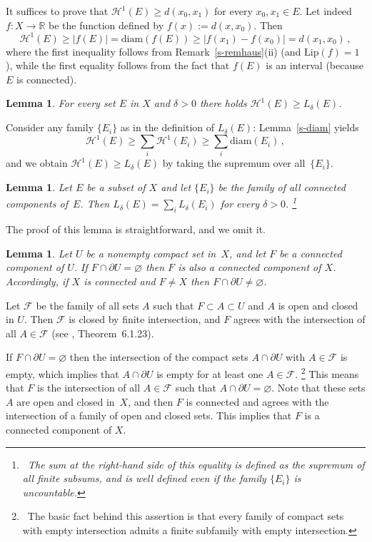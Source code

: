 \documentclass[11pt,reqno,a4paper,final]{amsart}
\makeatletter
\numberwithin{equation}{section}
\theoremstyle{mytheorem}
\newtheorem{lemma}[subsection]{Lemma}
\theoremstyle{myremark}
\theoremstyle{myparagraph}
\renewenvironment{proof}[1][\proofname]{\par 
  \pushQED{\qed}%
  \normalfont \topsep10\p@\@plus6\p@\relax 
  \trivlist 
  \item[\hskip\labelsep 
    \bfseries 
    #1\@addpunct{.}]\ignorespaces 
}{%
  \popQED\endtrivlist\@endpefalse 
}
\providecommand{\proofname}{Proof}
\newcommand{\footnoteb}[1]{\footnote{~#1}}
\newcommand{\R}{\mathbb{R}}
\newcommand{\F}{\mathscr{F}}
\newcommand{\Haus}{\mathscr{H}}
\newcommand{\bd}{\partial}
\newcommand{\diam}{\mathrm{diam}}
\newcommand{\Lip}{\mathrm{Lip}}
\makeatother
\begin{document}
\begin{proof}
It suffices to prove that $\Haus^1(E) \ge d(x_0,x_1)$ for every 
$x_0,x_1\in E$. Let indeed $f:X\to\R$ be the function defined by
$f(x):=d(x,x_0)$. Then 
\[
\Haus^1(E) \ge |f(E)| =\diam(f(E)) \ge |f(x_1)-f(x_0)| = d(x_1,x_0)
\, ,
\]
where the first inequality follows from Remark~\ref{s-remhaus}(ii) 
(and $\Lip(f)=1$), while the first equality follows 
from the fact that $f(E)$ is an interval (because $E$ is connected).
\end{proof}


\begin{lemma}
\label{s-easyineq}
For every set $E$ in $X$ and $\delta>0$ there holds 
$\Haus^1(E) \ge L_\delta(E)$. 
\end{lemma}

\begin{proof}
Consider any family 
$\{E_i\}$ as in the definition of $L_\delta(E)$:
Lemma~\ref{s-diam} yields
\[
\Haus^1(E) \ge \sum_i \Haus^1(E_i) \ge \sum_i\diam(E_i)
\, , 
\]
and we obtain $\Haus^1(E) \ge L_\delta(E)$ 
by taking the supremum over all~$\{E_i\}$.
\end{proof}



\begin{lemma}
\label{s-additivity}
Let $E$ be a subset of $X$ and let
$\{E_i\}$ be the family of all connected components of~$E$. Then
$L_\delta(E) = \sum_i L_\delta(E_i)$
for every $\delta>0$.%
%
\footnoteb{The sum at the right-hand side of this equality 
is defined as the supremum of all finite subsums, and is well 
defined even if the family $\{E_i\}$ is uncountable.}
%
\end{lemma}

The proof of this lemma is straightforward, and we omit it.


\begin{lemma}
\label{s-concompbordo}
Let $U$ be a nonempty compact set in~$X$, and let $F$ be a 
connected component of $U$.
If $F\cap\bd U=\varnothing$ then $F$ is also a connected 
component of $X$. Accordingly, if $X$ is connected and $F\ne X$ 
then $F\cap\bd U \ne \varnothing$.
\end{lemma}

\begin{proof}
Let $\F$ be the family of all sets $A$ such that $F \subset A \subset U$ 
and $A$ is open and closed in $U$. Then $\F$ is closed
by finite intersection, and $F$ agrees with the intersection of all $A\in\F$
(see \cite{Eng}, Theorem~6.1.23).

If $F\cap\bd U=\varnothing$ then the 
intersection of the compact sets $A\cap \bd U$ with $A\in\F$ is empty, 
which implies that $A\cap \bd U$ is empty for at least one $A\in\F$.%
%
\footnoteb{The basic fact behind this assertion is that every family 
of compact sets with empty intersection admits a finite
subfamily with empty intersection.}
%
This means that $F$ is the intersection of all $A\in\F$ such that
$A\cap \bd U = \varnothing$. 
Note that these sets $A$ are open and closed in~$X$, and then 
$F$ is connected and agrees with the intersection of a family 
of open and closed sets.
This implies that $F$ is a connected component of $X$. 
\end{proof}
\end{document}
